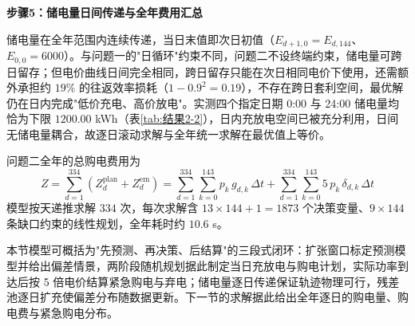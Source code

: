 \textbf{步骤5：储电量日间传递与全年费用汇总}

储电量在全年范围内连续传递，当日末值即次日初值（$E_{d+1,0}=E_{d,144}$、$E_{0,0}=6000$）。与问题一的"日循环"约束不同，问题二不设终端约束，储电量可跨日留存；但电价曲线日间完全相同，跨日留存只能在次日相同电价下使用，还需额外承担约 $19\%$ 的往返效率损耗（$1-0.9^2=0.19$），不存在跨日套利空间，最优解仍在日内完成"低价充电、高价放电"。实测四个指定日期 0:00 与 24:00 储电量均恰为下限 $1200.00$ kWh（表\ref{tab:结果2-2}），日内充放电空间已被充分利用，日间无储电量耦合，故逐日滚动求解与全年统一求解在最优值上等价\cite{zhoulin2011,sangbingyu2014}。

问题二全年的总购电费用为
\begin{equation}
    Z=\sum_{d=1}^{334}\left(Z^{\mathrm{plan}}_{d}+Z^{\mathrm{em}}_{d}\right)
    =\sum_{d=1}^{334}\sum_{k=0}^{143}p_k\,g_{d,k}\,\Delta t
    +\sum_{d=1}^{334}\sum_{k=0}^{143}5\,p_k\,\delta_{d,k}\,\Delta t
\end{equation}
模型按天递推求解 $334$ 次，每次求解含 $13\times144+1=1873$ 个决策变量、$9\times144$ 条缺口约束的线性规划，全年耗时约 $10.6$ s。

本节模型可概括为"先预测、再决策、后结算"的三段式闭环：扩张窗口标定预测模型并给出偏差情景，两阶段随机规划据此制定当日充放电与购电计划，实际功率到达后按 5 倍电价结算紧急购电与弃电；储电量逐日传递保证轨迹物理可行，残差池逐日扩充使偏差分布随数据更新。下一节的求解据此给出全年逐日的购电量、购电费与紧急购电分布。
